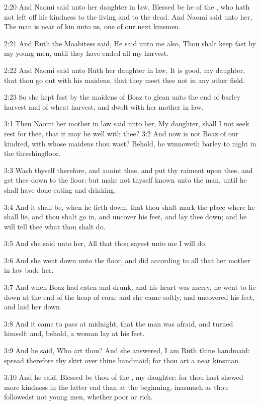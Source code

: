 2:20 And Naomi said unto her daughter in law, Blessed be he of the
\LORD, who hath not left off his kindness to the living and to the
dead. And Naomi said unto her, The man is near of kin unto us, one of
our next kinsmen.

2:21 And Ruth the Moabitess said, He said unto me also, Thou shalt
keep fast by my young men, until they have ended all my harvest.

2:22 And Naomi said unto Ruth her daughter in law, It is good, my
daughter, that thou go out with his maidens, that they meet thee not
in any other field.

2:23 So she kept fast by the maidens of Boaz to glean unto the end of
barley harvest and of wheat harvest; and dwelt with her mother in law.

3:1 Then Naomi her mother in law said unto her, My daughter, shall I
not seek rest for thee, that it may be well with thee?  3:2 And now is
not Boaz of our kindred, with whose maidens thou wast?  Behold, he
winnoweth barley to night in the threshingfloor.

3:3 Wash thyself therefore, and anoint thee, and put thy raiment upon
thee, and get thee down to the floor: but make not thyself known unto
the man, until he shall have done eating and drinking.

3:4 And it shall be, when he lieth down, that thou shalt mark the
place where he shall lie, and thou shalt go in, and uncover his feet,
and lay thee down; and he will tell thee what thou shalt do.

3:5 And she said unto her, All that thou sayest unto me I will do.

3:6 And she went down unto the floor, and did according to all that
her mother in law bade her.

3:7 And when Boaz had eaten and drunk, and his heart was merry, he
went to lie down at the end of the heap of corn: and she came softly,
and uncovered his feet, and laid her down.

3:8 And it came to pass at midnight, that the man was afraid, and
turned himself: and, behold, a woman lay at his feet.

3:9 And he said, Who art thou? And she answered, I am Ruth thine
handmaid: spread therefore thy skirt over thine handmaid; for thou art
a near kinsman.

3:10 And he said, Blessed be thou of the \LORD, my daughter: for thou
hast shewed more kindness in the latter end than at the beginning,
inasmuch as thou followedst not young men, whether poor or rich.

